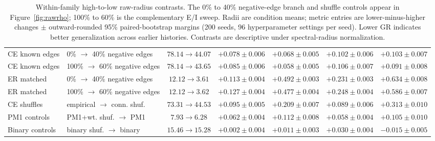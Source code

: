 \documentclass[mlabstract,onecolumn]{jmlr}
\begin{document}
\begin{table}[h]
\begin{tabular}{llccccc}
CE known edges & 0\% $\to$ 40\% negative edges & $78.14\to44.07$ & $+0.078\pm0.006$ & $+0.068\pm0.005$ & $+0.102\pm0.006$ & $+0.103\pm0.007$ \\
CE known edges & 100\% $\to$ 60\% negative edges & $78.14\to43.65$ & $+0.085\pm0.006$ & $+0.058\pm0.005$ & $+0.106\pm0.007$ & $+0.091\pm0.008$ \\
ER matched & 0\% $\to$ 40\% negative edges & $12.12\to3.61$ & $+0.113\pm0.004$ & $+0.492\pm0.003$ & $+0.231\pm0.003$ & $+0.634\pm0.008$ \\
ER matched & 100\% $\to$ 60\% negative edges & $12.12\to3.62$ & $+0.127\pm0.004$ & $+0.477\pm0.004$ & $+0.248\pm0.004$ & $+0.586\pm0.007$ \\
CE shuffles & empirical $\to$ conn. shuf. & $73.31\to44.53$ & $+0.095\pm0.005$ & $+0.209\pm0.007$ & $+0.089\pm0.006$ & $+0.313\pm0.010$ \\
PM1 controls & PM1+wt. shuf. $\to$ PM1 & $7.93\to6.28$ & $+0.062\pm0.004$ & $+0.112\pm0.008$ & $+0.058\pm0.004$ & $+0.105\pm0.010$ \\
Binary controls & binary shuf. $\to$ binary & $15.46\to15.28$ & $+0.002\pm0.004$ & $+0.011\pm0.003$ & $+0.030\pm0.004$ & $-0.015\pm0.005$ \\
\hline
\end{tabular}
\caption{Within-family high-to-low raw-radius contrasts. The 0\% to 40\% negative-edge branch and shuffle controls appear in Figure~\ref{fig:rawrho}; 100\% to 60\% is the complementary E/I sweep. Radii are condition means; metric entries are lower-minus-higher changes $\pm$ outward-rounded 95\% paired-bootstrap margins (200 seeds, 96 hyperparameter settings per seed). Lower GR indicates better generalization across earlier histories. Contrasts are descriptive under spectral-radius normalization.}
\label{tab:raw-rho-support}
\end{table}
\end{document}
